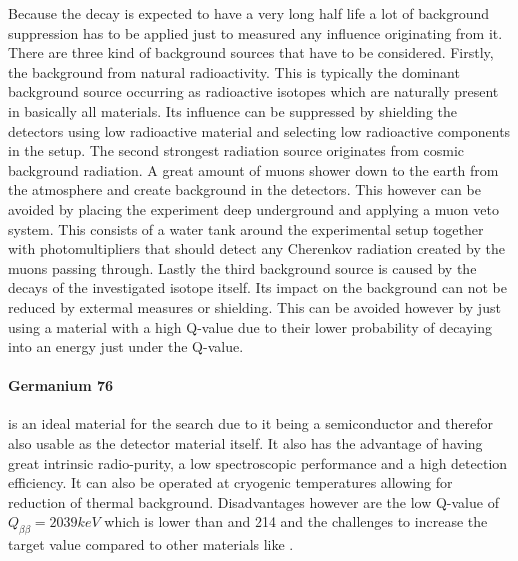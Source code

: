 Because the \onbb decay is expected to have a very long half life a lot of background suppression has to be applied just to measured any influence originating from it.
There are three kind of background sources that have to be considered.
Firstly, the background from natural radioactivity.
This is typically the dominant background source occurring as radioactive isotopes which are naturally present in basically all materials.
Its influence can be suppressed by shielding the detectors using low radioactive material and selecting low radioactive components in the setup. 
The second strongest radiation source originates from cosmic background radiation.
A great amount of muons shower down to the earth from the atmosphere and create background in the detectors.
This however can be avoided by placing the experiment deep underground and applying a muon veto system.
This consists of a water tank around the experimental setup together with photomultipliers that should detect any Cherenkov radiation created by the muons passing through.
Lastly the third  background source is caused by the \twonu decays of the investigated isotope itself.
Its impact on the background can not be reduced by extermal measures or shielding.
This can be avoided however by just using a material with a high Q-value due to their lower probability of decaying into an energy just under the Q-value. 
\\

\paragraph{Germanium 76}

 is an ideal material for the \onbb search due to it being a semiconductor and therefor also usable as the detector material itself.
It also has the advantage of having great intrinsic radio-purity, a low spectroscopic performance and a high detection efficiency.
It can also be operated at cryogenic temperatures allowing for reduction of thermal background.
Disadvantages however are the low Q-value of $Q_{\beta\beta} =  2039\unit{keV}$ which is lower than  and 
{214} and the challenges to increase the target value compared to other materials like .
\\

